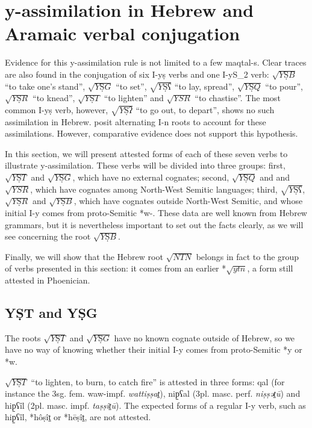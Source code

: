 \documentclass[oldfontcommands,oneside,a4paper,11pt]{article}
\newcommand{\racine}[1]{\begin{math}\sqrt{#1}\end{math}}
\newcommand{\forme}[1]{\textit{#1}}
\begin{document}
\begin{sloppypar}
\section{y-assimilation in Hebrew and Aramaic verbal  conjugation} \label{yodtsade}
Evidence for this y-assimilation rule  is not limited to a few maqtal-s. Clear traces are also found in the conjugation of six I-yṣ verbs and one I-yS_2 verb:
\racine{YṢB} ``to take one’s stand”, \racine{YṢG} ``to set”, \racine{YṢʕ} ``to lay, spread”, \racine{YṢQ} ``to pour”, \racine{YṢR} ``to knead”, \racine{YṢT} ``to lighten” and \racine{YSR} ``to chastise''. The most common I-yṣ verb, however, \racine{YṢʔ} ``to go out, to depart”, shows no such assimilation in Hebrew. \citet[185]{jouon06} posit alternating I-n roots to account for these assimilations. However, comparative evidence does not support this hypothesis. 


	In this section, we will present attested forms of each of these seven verbs to illustrate y-assimilation. These verbs will be divided into three groups: first, \racine{YṢT} and \racine{YṢG}, which have no external cognates; second, \racine{YṢQ} and  and \racine{YSR}, which have cognates among North-West Semitic languages; third, \racine{YṢʕ}, \racine{YṢR} and \racine{YṢB}, which have cognates outside North-West Semitic, and whose initial I-y comes from proto-Semitic *w-. These data are well known from Hebrew grammars, but it is nevertheless important to set out the facts clearly, as we will see concerning the root \racine{YṢB}.


Finally, we will show that the Hebrew root \racine{NTN} belongs in fact to the group of verbs presented in this section: it comes from an earlier *\racine{ytn}, a form still attested in Phoenician.

\subsection{YṢT and YṢG } \label{yst}

The roots \racine{YṢT} and \racine{YṢG} have no known cognate outside of Hebrew, so  we have no way of knowing whether their initial I-y comes from proto-Semitic *y or *w. 
 

  \racine{YṢT} ``to lighten, to burn, to catch fire'' is attested in three forms: qal (for instance the 3sg. fem. waw-impf. \forme{wattiṣṣat̠}), nip̠ʕal (3pl. masc. perf. \forme{niṣṣət̠ū}) and hip̠ʕîl (2pl. masc. impf. \forme{taṣṣît̠ū}). The expected forms of a regular I-y verb, such as hip̠ʕîl, *hôṣît̠ or *hēṣît̠, are not attested.



\end{sloppypar}
\end{document}
